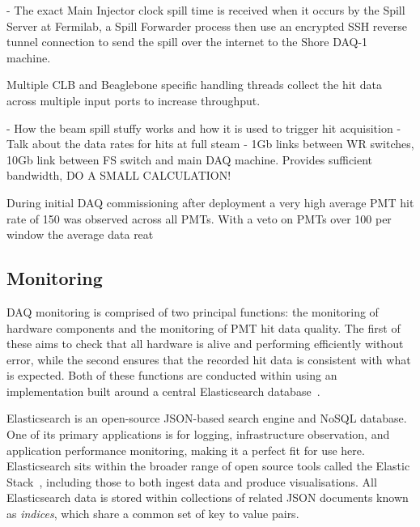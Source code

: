 - The exact Main Injector clock spill time is received when it occurs by the Spill Server at
Fermilab, a Spill Forwarder process then use an encrypted SSH reverse tunnel connection to send
the spill over the internet to the \chipsfive Shore DAQ-1 machine. 

Multiple CLB and Beaglebone specific handling
threads collect the hit data across multiple input ports to increase throughput. 

- How the beam spill stuffy works and how it is used to trigger hit acquisition
- Talk about the data rates for hits at full steam
- 1Gb links between WR switches, 10Gb link between FS switch and main DAQ machine. Provides
sufficient bandwidth, DO A SMALL CALCULATION!

During initial \chipsfive DAQ commissioning after deployment a very high average PMT hit rate of
\unit{150}{} was observed across all PMTs. With a veto on PMTs over
\unit{100}{} per window the average data reat

\subsection{Monitoring} %
\label{sec:daq_soft_monitor} %

\chipsfive DAQ monitoring is comprised of two principal functions: the monitoring of hardware
components and the monitoring of PMT hit data quality. The first of these aims to check that all
hardware is alive and performing efficiently without error, while the second ensures that the
recorded hit data is consistent with what is expected. Both of these functions are conducted
within \chipsfive using an implementation built around a central Elasticsearch
database~\cite{elasticsearch2020}.

Elasticsearch is an open-source JSON-based search engine and NoSQL database. One of its primary
applications is for logging, infrastructure observation, and application performance monitoring,
making it a perfect fit for use here. Elasticsearch sits within the broader range of open source
tools called the Elastic Stack~\cite{elasticstack2020}, including those to both ingest data and
produce visualisations. All Elasticsearch data is stored within collections of related JSON
documents known as \emph{indices}, which share a common set of key to value pairs.

